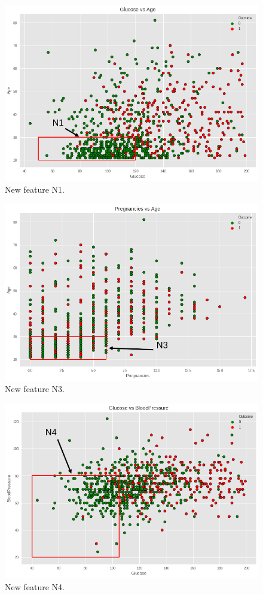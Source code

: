 \documentclass[12pt]{article}
\begin{document}
\begin{figure}[ht]
\centering
\includegraphics[width=1\textwidth]{download(1).png}
\caption{\label{fig:18} New feature N1.}
\end{figure}

\begin{figure}[ht]
\centering
\includegraphics[width=1\textwidth]{download(2).png}
\caption{\label{fig:19} New feature N3.}
\end{figure}

\begin{figure}[ht]
\centering
\includegraphics[width=1\textwidth]{download(3).png}
\caption{\label{fig:20}  New feature N4.}
\end{figure}
\end{document}
